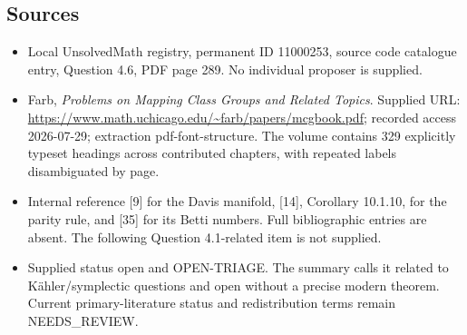 \documentclass[11pt]{article}
\begin{document}
\subsection{Sources}
\begin{itemize}
\item Local UnsolvedMath registry, permanent ID 11000253, source code catalogue entry, Question 4.6, PDF page 289. No individual proposer is supplied.
\item Farb, \emph{Problems on Mapping Class Groups and Related Topics}. Supplied URL: \url{https://www.math.uchicago.edu/~farb/papers/mcgbook.pdf}; recorded access 2026-07-29; extraction pdf-font-structure. The volume contains 329 explicitly typeset headings across contributed chapters, with repeated labels disambiguated by page.
\item Internal reference [9] for the Davis manifold, [14], Corollary 10.1.10, for the parity rule, and [35] for its Betti numbers. Full bibliographic entries are absent. The following Question 4.1-related item is not supplied.
\item Supplied status open and OPEN-TRIAGE. The summary calls it related to K\"ahler/symplectic questions and open without a precise modern theorem. Current primary-literature status and redistribution terms remain NEEDS\_REVIEW.
\end{itemize}
\end{document}
